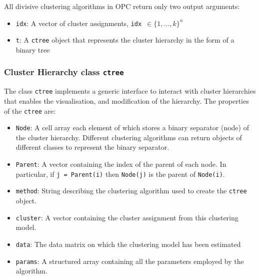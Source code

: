 \documentclass{book}
\begin{document}
All divisive clustering algorithms in OPC return only two output arguments:
%
\begin{itemize}

\item[] {\tt idx}: A vector of cluster assignments, {\tt idx}~$\in \{1,\ldots,k\}^n$

\item[] {\tt t}: A {\tt ctree} object that represents the cluster hierarchy in the form of a binary tree

\end{itemize}

\subsubsection*{Cluster Hierarchy class {\tt ctree}}

The class {\tt ctree} implements a generic interface to interact with cluster
hierarchies that enables the visualisation, and modification of the hierarchy.
%
The properties of the {\tt ctree} are:
%
\begin{itemize}

\item {\tt Node}: A cell array each element of which stores a binary separator (node) of the
cluster hierarchy. Different clustering algorithms can return objects of different classes
to represent the binary separator.

\item {\tt Parent}: A vector containing the index of the parent of each node. In particular, if {\tt j = Parent(i)} then
{\tt Node(j)} is the parent of {\tt Node(i)}. 
%

\item {\tt method}: String describing the clustering algorithm used to create the {\tt ctree} object.

\item {\tt cluster}: A vector containing the cluster assignment from this clustering model.

\item {\tt data}: The data matrix on which the clustering model has been estimated

\item {\tt params}: A structured array containing all the parameters employed by the
algorithm.

\end{itemize}
\end{document}
